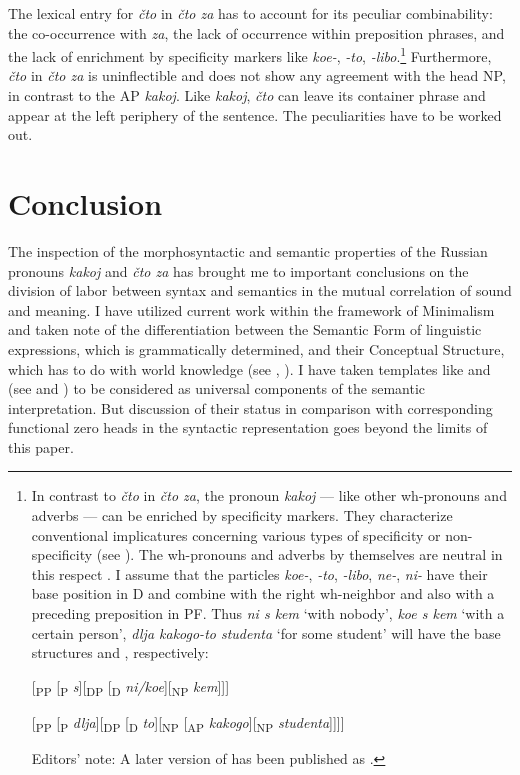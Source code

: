 \documentclass[output=paper,colorlinks,citecolor=brown]{langscibook}
\begin{document}
The lexical entry for \textit{čto} in \textit{čto za} has to account for its peculiar combinability: the co-occurrence with \textit{za}, the lack of occurrence within preposition phrases, and the lack of enrichment by specificity markers like \textit{koe-}, \textit{-to}, \textit{-libo}.\footnote{\label{fn:zi08:7}In contrast to \textit{čto} in \textit{čto za}, the pronoun \textit{kakoj} — like other wh-pronouns and adverbs — can be enriched by specificity markers. They characterize conventional implicatures concerning various types of specificity or non-specificity (see \citealt{Kagan2007}). The wh-pronouns and adverbs by themselves are neutral in this respect \citep{zi08:Zimmermann2000}. I assume that the particles \textit{koe-}, \textit{-to}, \textit{-libo}, \textit{ne-}, \textit{ni-} have their base position in D and combine with the right wh-neighbor and also with a preceding preposition in PF. Thus \textit{ni s kem} `with nobody', \textit{koe s kem} `with a certain person', \textit{dlja kakogo-to studenta} `for some student' will have the base structures  and , respectively:

\ea \label{ex:zi08:fn8i} [\textsubscript{PP} [\textsubscript{P} \textit{s}][\textsubscript{DP} [\textsubscript{D} \textit{ni/koe}][\textsubscript{NP} \textit{kem}]]]
\z

\ea \label{ex:zi08:fn8ii} [\textsubscript{PP} [\textsubscript{P} \textit{dlja}][\textsubscript{DP} [\textsubscript{D} \textit{to}][\textsubscript{NP} [\textsubscript{AP} \textit{kakogo}][\textsubscript{NP} \textit{studenta}]]]]
\z

\noindent Editors' note: A later version of \textcite{Kagan2007} has been published as \textcite{Kagan2011}.
} Furthermore, \textit{čto} in \textit{čto za} is uninflectible and does not show any agreement with the head NP, in contrast to the AP \textit{kakoj}. Like \textit{kakoj}, \textit{čto} can leave its container phrase and appear at the left periphery of the sentence. The peculiarities have to be worked out.

\section{Conclusion} \label{sec:zi08:4}

The inspection of the morphosyntactic and semantic properties of the Russian pronouns \textit{kakoj} and \textit{čto za} has brought me to important conclusions on the division of labor between syntax and semantics in the mutual correlation of sound and meaning. I have utilized current work within the framework of Minimalism and taken note of the differentiation between the Semantic Form of linguistic expressions, which is grammatically determined, and their Conceptual Structure, which has to do with world knowledge (see \citealt{zi08:Bierwisch-Lang1987}, \citealt{zi08:Bierwisch2007}). I have taken templates like  and  (see  and ) to be considered as universal components of the semantic interpretation. But discussion of their status in comparison with corresponding functional zero heads in the syntactic representation goes beyond the limits of this paper.
\end{document}
